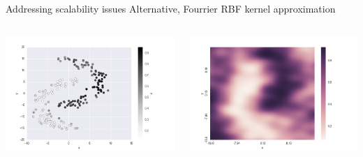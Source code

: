 \documentclass[11pt]{beamer}
\begin{document}
\begin{frame}{Addressing scalability issues}
Alternative, Fourrier RBF kernel approximation
\begin{columns}
\includegraphics[scale=0.3]{arcs_rbfsampler.png} 

\includegraphics[scale=0.3]{arcs_rbfsampler_hm.png} 
\end{columns}

\end{frame}
\end{document}
